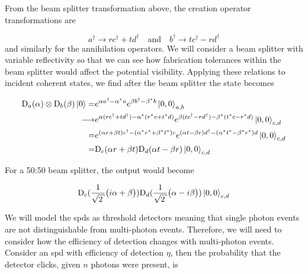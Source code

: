 %

From the beam splitter transformation above, the creation operator transformations are

\begin{equation}
	a^\dagger \rightarrow rc^\dagger + td^\dagger \quad \text{and} \quad b^\dagger \rightarrow tc^\dagger - rd^\dagger
\end{equation}
and similarly for the annihilation operators. We will consider a beam splitter with variable reflectivity so that we can see how fabrication tolerances within the beam splitter would affect the potential visibility. Applying these relations to incident coherent states, we find after the beam splitter the state becomes

\begin{align}
	\text{D}_a(\alpha)\otimes\text{D}_b(\beta)\ket{0} =&  e^{\alpha a^\dagger - \alpha^\ast a} e^{\beta b^\dagger - \beta^\ast b}\ket{0,0}_{a,b}\\
	\longrightarrow&  e^{\alpha (r c^\dagger + t d^\dagger) - \alpha^\ast (r^\ast c + t^\ast d)}e^{\beta (t c^\dagger - r d^\dagger) - \beta^\ast (t^\ast c - r^\ast d)}\ket{0,0}_{c,d}\\
	=&  e^{(\alpha r + \beta t) c^\dagger - (\alpha^\ast r^\ast + \beta^\ast t^\ast) c} e^{(\alpha t - \beta r) d^\dagger - (\alpha^\ast t^\ast - \beta^\ast r^\ast) d}\ket{0,0}_{c,d}\\
	=&  \text{D}_c(\alpha r + \beta t)\text{D}_d(\alpha t - \beta r)\ket{0,0}_{c,d}
\end{align}

For a 50:50 beam splitter, the output would become

\begin{equation}
	\text{D}_c(\frac{1}{\sqrt{2}}\big(i\alpha + \beta\big))\text{D}_d(\frac{1}{\sqrt{2}}\big(\alpha - i\beta\big))\ket{0,0}_{c,d}
\end{equation}

We will model the \acp{spd} as threshold detectors meaning that single photon events are not distinguishable from multi-photon events. Therefore, we will need to consider how the efficiency of detection changes with multi-photon events. Consider an \ac{spd} with efficiency of detection $\eta$, then the probability that the detector clicks, given $n$ photons were present, is

